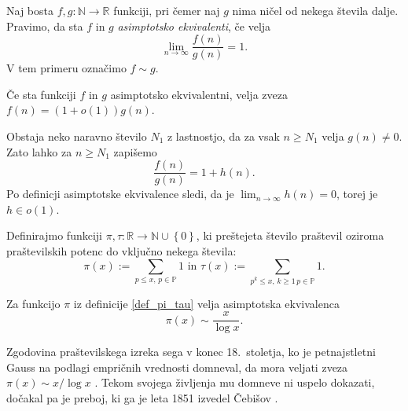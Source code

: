 \begin{definicija}
\label{def_asimptotska_ekvivalenca}
Naj bosta $f, g : \mathbb{N} \to  \mathbb{R}$ funkciji, pri čemer naj $g$ nima ničel od nekega števila dalje. Pravimo, da sta $f$ in $g$ \emph{asimptotsko ekvivalenti}, če velja \begin{equation*}
\lim_{n \to \infty} \frac{f(n)}{g(n)} = 1.
\end{equation*}
V tem primeru označimo $f \sim g$.
\end{definicija}
\begin{opomba}
Če sta funkciji $f$ in $g$ asimptotsko ekvivalentni, velja zveza $f(n) = (1 + o(1)) g(n)$.
\end{opomba}
\begin{dokaz}
Obstaja neko naravno število $N_1$ z lastnostjo, da za vsak $n \ge N_1$ velja $g(n) \neq 0$. Zato lahko za $n \ge N_1$ zapišemo \begin{equation*}
\frac{f(n)}{g(n)} = 1 + h(n).
\end{equation*}  
Po definicji asimptotske ekvivalence sledi, da je $\lim_{n \to \infty} h(n) = 0$, torej je $h \in o(1)$.  
\end{dokaz}

\begin{definicija}
\label{def_pi_tau}
Definirajmo funkciji $\pi, \tau : \mathbb{R} \to  \mathbb{N} \cup \left\{ 0\right\}$, ki preštejeta število praštevil oziroma praštevilskih potenc do vključno nekega števila: \begin{equation*}
\pi(x) :=  \sum_{p \le x, \, p \in \mathbb{P}} 1 \text{ in } \tau(x) :=  \sum_{p^{k} \le x, \, k \ge 1 \,   p \in \mathbb{P}} 1.
\end{equation*}  
\end{definicija}

\begin{izrek}
\label{izr_prastevilski_izrek}
 Za funkcijo $\pi$ iz definicije \ref{def_pi_tau} velja asimptotska ekvivalenca \begin{equation*}
 \pi(x) \sim \frac{x}{\log x}.
 \end{equation*}  
\end{izrek}

Zgodovina praštevilskega izreka sega v konec 18.~stoletja, ko je petnajstletni Gauss na podlagi empričnih vrednosti domneval, da mora veljati
zveza $\pi(x) \sim x / \log x$ \cite[str.~1]{mit_lecture_notes_2021}. Tekom svojega življenja mu domneve ni uspelo dokazati, dočakal pa je preboj, ki ga je leta
1851 izvedel Čebišov \cite[str.~4--5]{Granville_1993}.

